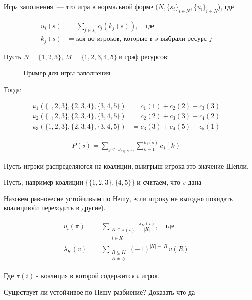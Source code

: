 \begin{df}
	Игра заполнения~--- это игра в нормальной форме $(N, \{s_i\}_{i \in N}, \{u_i\}_{i \in N}$), где 

	\begin{align*}
		u_i(s) &= \sum_{j \in s_i} c_j(k_j(s)), \quad \text{где} \\
		k_j(s) &= \text{кол-во игроков, которые в $s$ выбрали ресурс  $j$}
	\end{align*}

\end{df}

\begin{exmpl}
	Пусть $N = \{1, 2, 3\}, \, M = \{1, 2, 3, 4, 5\}$ и граф ресурсов:
\begin{figure}[ht]
    \centering
    \caption{Пример для игры заполнения}
    \label{fig:example-congestion-game}
\end{figure}

Тогда:

\begin{align*}
	u_1(\{1, 2, 3\}, \{2, 3, 4\}, \{3, 4, 5\}) &= c_1(1) + c_2(2) + c_3(3) \\
	u_2(\{1, 2, 3\}, \{2, 3, 4\}, \{3, 4, 5\}) &= c_2(2) + c_3(3) + c_4(2) \\
	u_3(\{1, 2, 3\}, \{2, 3, 4\}, \{3, 4, 5\}) &= c_3(3) + c_4(5) + c_5(1)
\end{align*}

\end{exmpl}

\begin{align*}
	P(s) = \sum_{j \in \cup_{i \in N} s_i} \sum_{k = 1}^{k_j(s)} c_j(k)
\end{align*}

\begin{problem}
	Пусть игроки распределяются на коалиции, выигрыш игрока это значение Шепли.

	Пусть, например коалиции $\{\{1, 2, 3\}, \{4, 5\}\}$ и считаем, что $v$ дана.

	Назовем равновесие устойчивым по Нешу, если игроку не выгодно покидать коалицию(и переходить в другие).

	\begin{align*}
		u_i(\pi) &= \sum_{\substack{K \subseteq \pi(i) \\ i \in K}} \frac{\lambda_K(v)}{|K|}, \quad \text{где} \\
		\lambda_K(v) &= \sum_{\substack{R \subseteq K \\ R \neq \varnothing}} (-1)^{|K| - |R|} v(R)
	\end{align*}

	Где $\pi(i)$ - коалиция в которой содержится  $i$ игрок.

	Существует ли устойчивое по Нешу разбиение? Доказать что да
\end{problem}


